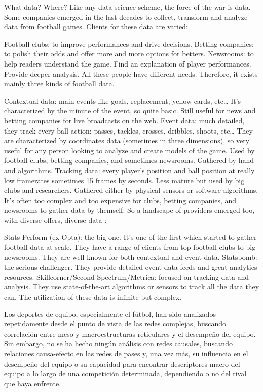 What data? Where?
Like any data-science scheme, the force of the war is data. Some companies emerged in the last decades to collect, transform and analyze data from football games. Clients for these data are varied:

Football clubs: to improve performances and drive decisions.
Betting companies: to polish their odds and offer more and more options for betters.
Newsrooms: to help readers understand the game. Find an explanation of player performances. Provide deeper analysis.
All these people have different needs. Therefore, it exists mainly three kinds of football data.

Contextual data: main events like goals, replacement, yellow cards, etc… It’s characterized by the minute of the event, so quite basic. Still useful for news and betting companies for live broadcasts on the web.
Event data: much detailed, they track every ball action: passes, tackles, crosses, dribbles, shoots, etc… They are characterized by coordinates data (sometimes in three dimensions), so very useful for any person looking to analyze and create models of the game. Used by football clubs, betting companies, and sometimes newsrooms. Gathered by hand and algorithms.
Tracking data: every player's position and ball position at really low framerates sometimes 15 frames by seconds. Less mature but used by big clubs and researchers. Gathered either by physical sensors or software algorithms.
It’s often too complex and too expensive for clubs, betting companies, and newsrooms to gather data by themself. So a landscape of providers emerged too, with diverse offers, diverse data :

Stats Perform (ex Opta): the big one. It’s one of the first which started to gather football data at scale. They have a range of clients from top football clubs to big newsrooms. They are well known for both contextual and event data.
Statsbomb: the serious challenger. They provide detailed event data feeds and great analytics resources.
Skillcorner/Second Spectrum/Metrica: focused on tracking data and analysis. They use state-of-the-art algorithms or sensors to track all the data they can. The utilization of these data is infinite but complex.



Los deportes de equipo, especialmente el fútbol, han sido analizados 
repetidamente desde el punto de vista de las redes complejas, buscando 
correlación entre meso y macroestructuras reticulares y el desempeño del 
equipo. Sin embargo, no se ha hecho ningún análisis con redes causales, 
buscando relaciones causa-efecto en las redes de pases y, una vez más, 
su influencia en el desempeño del equipo o su capacidad para encontrar 
descriptores macro del equipo a lo largo de una competición determinada, 
dependiendo o no del rival que haya enfrente.

